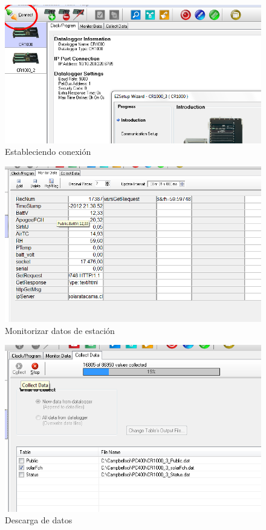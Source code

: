 \newpage
\begin{figure}[h!]
        \centering
        \includegraphics[width=400pt]{images/pruebas3}
        \caption{Estableciendo conexión}
        \label{ether3}
\end{figure}
\begin{figure}[h!]
        \centering
        \includegraphics[width=400pt]{images/pruebas4}
        \caption{Monitorizar datos de estación}
        \label{ether4}
\end{figure}

\newpage
\begin{figure}[h!]
        \centering
        \includegraphics[width=400pt]{images/pruebas5}
        \caption{Descarga de datos}
        \label{ether5}
\end{figure}

